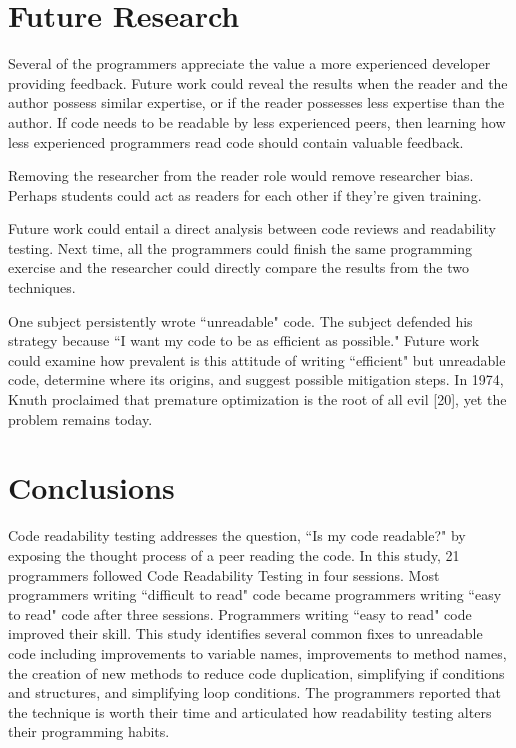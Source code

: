 \documentclass[conference]{IEEEtran}
\begin{document}
\section{Future Research}
Several of the programmers appreciate the value a more experienced developer providing feedback. Future work could reveal the results when the reader and the author possess similar expertise, or if the reader possesses less expertise than the author. If code needs to be readable by less experienced peers, then learning how less experienced programmers read code should contain valuable feedback.

Removing the researcher from the reader role would remove researcher bias. Perhaps students could act as readers for each other if they’re given training.

Future work could entail a direct analysis between code reviews and readability testing. Next time, all the programmers could finish the same programming exercise and the researcher could directly compare the results from the two techniques.

One subject persistently wrote ``unreadable" code. The subject defended his strategy because ``I want my code to be as efficient as possible." Future work could examine how prevalent is this attitude of writing ``efficient" but unreadable code, determine where its origins, and suggest possible mitigation steps. In 1974, Knuth proclaimed that premature optimization is the root of all evil [20], yet the problem remains today.

\section{Conclusions}
Code readability testing addresses the question, ``Is my code readable?" by exposing the thought process of a peer reading the code. In this study, 21 programmers followed Code Readability Testing in four sessions. Most programmers writing ``difficult to read" code became programmers writing ``easy to read" code after three sessions. Programmers writing ``easy to read" code improved their skill. This study identifies several common fixes to unreadable code including improvements to variable names, improvements to method names, the creation of new methods to reduce code duplication, simplifying if conditions and structures, and simplifying loop conditions. The programmers reported that the technique is worth their time and articulated how readability testing alters their programming habits.
\end{document}
